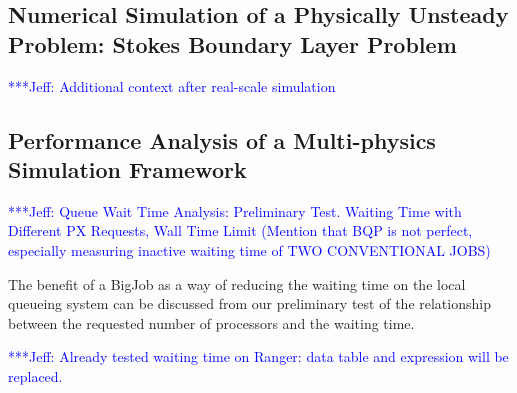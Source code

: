 \documentclass[conference,final]{IEEEtran}
\newcommand{\skonote}[1]{ {\textcolor{blue} { ***Jeff: #1 }}}
\newcommand{\skonote}[1]{}
\begin{document}
\subsection{Numerical Simulation of a Physically Unsteady Problem: Stokes Boundary Layer Problem}

\skonote{Additional context after real-scale simulation}


\subsection{Performance Analysis of a Multi-physics Simulation Framework}

\skonote{Queue Wait Time Analysis: Preliminary Test. Waiting Time with Different PX Requests, Wall Time Limit
(Mention that BQP is not perfect, especially measuring inactive waiting time of TWO CONVENTIONAL JOBS)}

The benefit of a BigJob as a way of reducing the waiting time on the local queueing system can be discussed from our preliminary test of the relationship between the requested number of processors and the waiting time.
\newline

\skonote{Already tested waiting time on Ranger: data table and expression will be replaced.}
\end{document}
